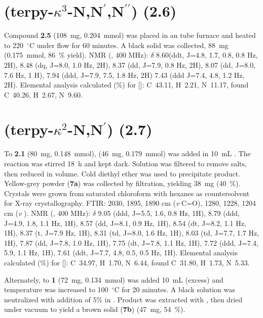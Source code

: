 \section{(terpy-$\kappa^3$-N,N$^\prime$,N$^{\prime \prime}$) (\textbf{2.6})} \label{sec.c6}
Compound \textbf{2.5} (108~mg, 0.204~mmol) was placed in an tube furnace and heated to 220~$^\circ$C under  flow for 60 minutes. A black solid was collected, 88~mg (0.175~mmol, 86~\% yield).  NMR (, 400 MHz): $\delta$ 8.60(ddt, J=4.8, 1.7, 0.8, 0.8 Hz, 2H), 8.48 (dq, J=8.0, 1.0 Hz, 2H), 8.37 (dd, J=7.9, 0.8 Hz, 2H), 8.07 (dd, J=8.0, 7.6 Hz, 1 H), 7.94 (ddd, J=7.9, 7.5, 1.8 Hz, 2H) 7.43 (ddd J=7.4, 4.8, 1.2 Hz, 2H). Elemental analysis calculated (\%) for []: C~43.11, H~2.21, N~11.17, found C~40.26, H~2.67, N~9.60.

\section{(terpy-$\kappa^2$-N,N$^\prime$) (\textbf{2.7})}\label{sec.c7}
To \textbf{2.1} (80~mg, 0.148~mmol),  (46~mg, 0.179~mmol) was added in 10~mL . The reaction was stirred 18~h and kept dark. Solution was filtered to remove salts, then reduced in volume. Cold diethyl ether was used to precipitate product. Yellow-grey powder (\textbf{7a}) was collected by filtration, yielding 38~mg (40~\%). Crystals were grown from saturated chloroform with hexanes as countersolvent for X-ray crystallography. FTIR: 2030, 1895, 1890 cm (\textit{v} C=O), 1280, 1228, 1204 cm (\textit{v} ).  NMR (, 400 MHz): $\delta$ 9.05 (ddd, J=5.5, 1.6, 0.8 Hz, 1H), 8.79 (ddd, J=4.9, 1.8, 1.1 Hz, 1H), 8.57 (dd, J=8.1, 0.9 Hz, 1H), 8.54 (dt, J=8.2, 1.1 Hz, 1H), 8.37 (t, J=7.9 Hz, 1H), 8.31 (td, J=8.0, 1.6 Hz, 1H), 8.03 (td, J=7.7, 1.7 Hz, 1H), 7.87 (dd, J=7.8, 1.0 Hz, 1H), 7.75 (dt, J=7.8, 1.1 Hz, 1H), 7.72 (ddd, J=7.4, 5.9, 1.1 Hz, 1H), 7.61 (ddt, J=7.7, 4.8, 0.5, 0.5 Hz, 1H).  Elemental analysis calculated (\%) for []: C~34.97, H~1.70, N~6.44, found C~31.80, H~1.73, N~5.33.

Alternately, to \textbf{1} (72~mg, 0.134~mmol) was added 10~mL  (excess) and temperature was increased to 100~$^\circ$C for 20 minutes. A black solution was neutralized with addition of 5\%  in . Product was extracted with , then dried under vacuum to yield a brown solid (\textbf{7b}) (47~mg, 54~\%).

